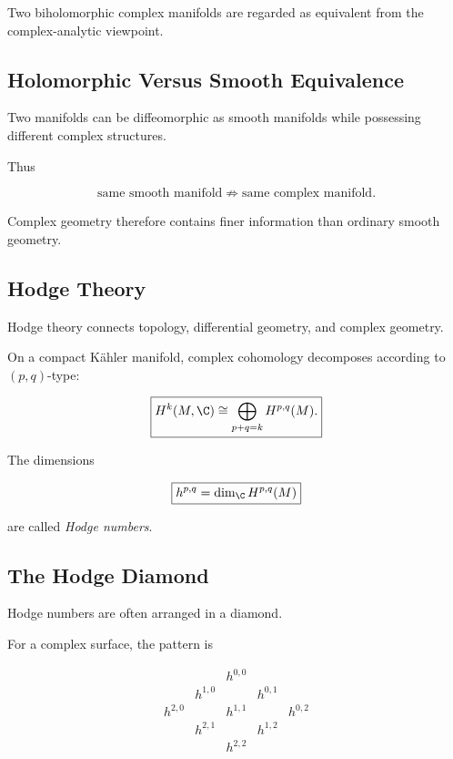Two biholomorphic complex manifolds are regarded as equivalent from the
complex-analytic viewpoint.

\subsection{Holomorphic Versus Smooth Equivalence}
\label{subsec:holomorphic-vs-smooth}

Two manifolds can be diffeomorphic as smooth manifolds while possessing
different complex structures.

Thus

\[
\boxed{
\text{same smooth manifold}
\not\Longrightarrow
\text{same complex manifold}.
}
\]

Complex geometry therefore contains finer information than ordinary smooth
geometry.

\subsection{Hodge Theory}
\label{subsec:hodge-theory-complex}

Hodge theory connects topology, differential geometry, and complex geometry.

On a compact K\"ahler manifold, complex cohomology decomposes according to
\((p,q)\)-type:

\[
\boxed{
H^k(M,\C)
\cong
\bigoplus_{p+q=k}
H^{p,q}(M).
}
\]

The dimensions

\[
\boxed{
h^{p,q}
=
\dim_{\C}H^{p,q}(M)
}
\]

are called \emph{Hodge numbers}.

\subsection{The Hodge Diamond}
\label{subsec:hodge-diamond}

Hodge numbers are often arranged in a diamond.

For a complex surface, the pattern is

\[
\boxed{
\begin{array}{ccccc}
&&h^{0,0}&&\\
&h^{1,0}&&h^{0,1}&\\
h^{2,0}&&h^{1,1}&&h^{0,2}\\
&h^{2,1}&&h^{1,2}&\\
&&h^{2,2}&&
\end{array}
}
\]

